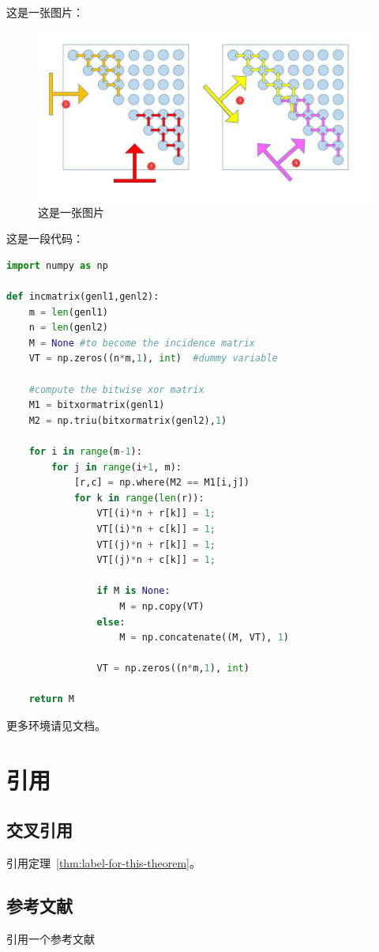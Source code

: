 这是一张图片：

\begin{figure}[hbt]
	\centering
	\includegraphics{image/dynamic-programming-1.png}
	\caption{这是一张图片}\label{fig:example}
\end{figure}

这是一段代码：

\begin{lstlisting}[language=Python, caption=Python example]
import numpy as np

def incmatrix(genl1,genl2):
    m = len(genl1)
    n = len(genl2)
    M = None #to become the incidence matrix
    VT = np.zeros((n*m,1), int)  #dummy variable

    #compute the bitwise xor matrix
    M1 = bitxormatrix(genl1)
    M2 = np.triu(bitxormatrix(genl2),1)

    for i in range(m-1):
        for j in range(i+1, m):
            [r,c] = np.where(M2 == M1[i,j])
            for k in range(len(r)):
                VT[(i)*n + r[k]] = 1;
                VT[(i)*n + c[k]] = 1;
                VT[(j)*n + r[k]] = 1;
                VT[(j)*n + c[k]] = 1;

                if M is None:
                    M = np.copy(VT)
                else:
                    M = np.concatenate((M, VT), 1)

                VT = np.zeros((n*m,1), int)

    return M
\end{lstlisting}

更多环境请见文档。

\section{引用}

\subsection{交叉引用}

引用定理~\ref{thm:label-for-this-theorem}。

\subsection{参考文献}

引用一个参考文献~\cite{cormen2009introduction}
